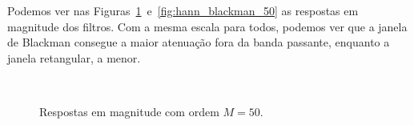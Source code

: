 \documentclass{homeworkclass}
\begin{document}
\begin{homeworkProblem}
Podemos ver nas Figuras~\ref{fig:rect_hamming_m_50}~e~\ref{fig:hann_blackman_50} as respostas em magnitude dos filtros. Com a mesma escala para todos, podemos ver que a janela de Blackman consegue a maior atenuação fora da banda passante, enquanto a janela retangular, a menor.
\begin{figure}[!h]
\centering
{}
~
\caption{Respostas em magnitude com ordem $M = 50$.}
\label{fig:rect_hamming_m_50}
\end{figure}

\pagebreak


\begin{figure}[!ht]
~


\end{figure}
\end{homeworkProblem}
\end{document}
